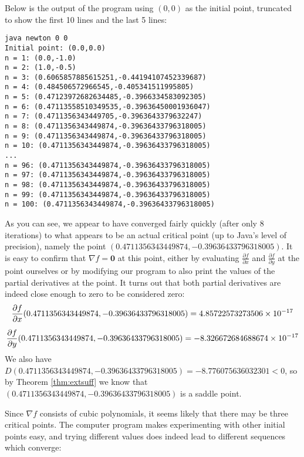\begin{exmp}
Below is the output of the program using $(0,0)$ as the initial point, truncated to show the first 10 lines and
the last 5 lines:

\begin{verbatim}
java newton 0 0
Initial point: (0.0,0.0)
n = 1: (0.0,-1.0)
n = 2: (1.0,-0.5)
n = 3: (0.6065857885615251,-0.44194107452339687)
n = 4: (0.484506572966545,-0.405341511995805)
n = 5: (0.47123972682634485,-0.3966334583092305)
n = 6: (0.47113558510349535,-0.39636450001936047)
n = 7: (0.4711356343449705,-0.3963643379632247)
n = 8: (0.4711356343449874,-0.39636433796318005)
n = 9: (0.4711356343449874,-0.39636433796318005)
n = 10: (0.4711356343449874,-0.39636433796318005)
...
n = 96: (0.4711356343449874,-0.39636433796318005)
n = 97: (0.4711356343449874,-0.39636433796318005)
n = 98: (0.4711356343449874,-0.39636433796318005)
n = 99: (0.4711356343449874,-0.39636433796318005)
n = 100: (0.4711356343449874,-0.39636433796318005)
\end{verbatim}

As you can see, we appear to have converged fairly quickly (after only 8 iterations) to what appears to be an actual
critical point (up to Java's level of precision), namely the point
$(0.4711356343449874,-0.39636433796318005)$. It is easy to confirm that $\nabla f = \textbf{0}$ at this point,
either by evaluating $\frac{\partial f}{\partial x}$ and $\frac{\partial f}{\partial y}$ at the point ourselves or by
modifying our program to also print the values of the partial derivatives at the point. It turns out that
both partial derivatives are indeed close enough to zero to be considered zero:
\begin{gather*}
 \frac{\partial f}{\partial x}(0.4711356343449874,-0.39636433796318005) = 4.85722573273506 \times 10^{-17}\vspace{2mm}\\
 \frac{\partial f}{\partial y}(0.4711356343449874,-0.39636433796318005) = -8.326672684688674 \times 10^{-17}
\end{gather*}
We also have $D(0.4711356343449874,-0.39636433796318005) = -8.776075636032301 < 0$, so by
Theorem \ref{thm:extsuff} we know that $(0.4711356343449874,-0.39636433796318005)$ is a saddle point.

Since $\nabla f$ consists of cubic polynomials, it seems likely that there may be three critical points.
The computer program makes experimenting with other initial points easy, and trying different values does indeed lead
to different sequences which converge:


\end{exmp}
